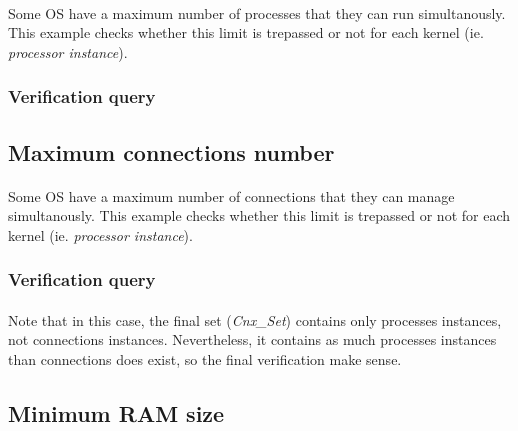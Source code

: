 \paragraph{}
Some OS have a maximum number of processes that they can run
simultanously. This example checks whether this limit 
is trepassed or not for each kernel (ie. \textit{processor 
instance}).

\subsubsection {Verification query}
\paragraph{}


\subsection {Maximum connections number}

\paragraph{}
Some OS have a maximum number of connections that they can 
manage simultanously. This example checks whether this limit 
is trepassed or not for each kernel (ie. \textit{processor 
instance}).

\subsubsection {Verification query}
\paragraph{}


\paragraph{}
Note that in this case, the final set (\textit{Cnx\_Set}) contains
only processes instances, not connections instances. Nevertheless,
it contains as much processes instances than connections does exist,
so the final verification make sense.

\subsection {Minimum RAM size}

